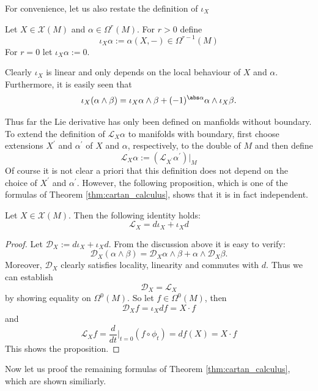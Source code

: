 For convenience, let us also restate the definition of $\iota_X$
\begin{definition}
    Let $X \in \mathscr{X}(M)$ and $\alpha \in \Omega^r(M)$. For $r > 0$ define
    \[
    \iota_X \alpha := \alpha(X,-) \in \Omega^{r-1}(M)
    \]
    For $r=0$ let $\iota_X \alpha := 0$.
\end{definition}

Clearly $\iota_X$ is linear and only depends on the local behaviour of $X$ and $\alpha$. Furthermore, it is easily seen that 
\[
\iota_X(\alpha \wedge \beta) = \iota_X\alpha \wedge \beta + (-1)^{\abs \alpha} \alpha \wedge \iota_X\beta.
\]

Thus far the Lie derivative has only been defined on manfiolds without boundary. To extend the definition of $\mathcal{L}_X\alpha$ to manifolds with boundary, first choose extensions $X^\prime$ and $\alpha^\prime$ of $X$ and $\alpha$, respectively, to the double of $M$ and then define
\[
\mathcal{L}_X \alpha := (\mathcal{L}_{X^\prime}\alpha^\prime)|_M
\]
Of course it is not clear a priori that this definition does not depend on the choice of $X^\prime$ and $\alpha^\prime$. However, the following proposition, which is one of the formulas of Theorem \ref{thm:cartan_calculus}, shows that it is in fact independent.

\begin{proposition}
    Let $X \in \mathscr{X}(M)$. Then the following identity holds:
    \[\mathcal{L}_X = d\iota_X + \iota_Xd\]
\end{proposition}
\begin{proof}
    Let $\mathcal{D}_X := d\iota_X + \iota_Xd$. From the discussion above it is easy to verify:
    \[
    \mathcal{D}_X(\alpha \wedge \beta) = \mathcal{D}_X\alpha \wedge \beta + \alpha \wedge \mathcal{D}_X\beta.
    \]
    Moreover, $\mathcal{D}_X$ clearly satisfies locality, linearity and commutes with $d$. Thus we can establish 
    \[
    \mathcal{D}_X = \mathcal{L}_X
    \]
    by showing equality on $\Omega^0(M)$. So let $f \in \Omega^0(M)$, then 
    \[
    \mathcal{D}_X f = \iota_Xdf = X \cdot f
    \]
    and
    \[
    \mathcal{L}_Xf = \frac{d}{dt}\bigg|_{t=0} (f \circ \phi_t) = df(X) = X \cdot f
    \]
    This shows the proposition.
\end{proof}

Now let us proof the remaining formulas of Theorem \ref{thm:cartan_calculus}, which are shown similiarly.

